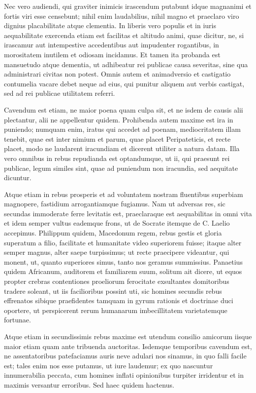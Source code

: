  Nec vero audiendi, qui graviter inimicis irascendum putabunt idque magnanimi et fortis viri esse censebunt; nihil enim laudabilius, nihil magno et praeclaro viro dignius placabilitate atque clementia. In liberis vero populis et in iuris aequabilitate exercenda etiam est facilitas et altitudo animi, quae dicitur, ne, si irascamur aut intempestive accedentibus aut impudenter rogantibus, in morositatem inutilem et odiosam incidamus. Et tamen ita probanda est mansuetudo atque dementia, ut adhibeatur rei publicae causa severitas, sine qua administrari civitas non potest. Omnis autem et animadversio et castigatio contumelia vacare debet neque ad eius, qui punitur aliquem aut verbis castigat, sed ad rei publicae utilitatem referri.

 Cavendum est etiam, ne maior poena quam culpa sit, et ne isdem de causis alii plectantur, alii ne appellentur quidem. Prohibenda autem maxime est ira in puniendo; numquam enim, iratus qui accedet ad poenam, mediocritatem illam tenebit, quae est inter nimium et parum, quae placet Peripateticis, et recte placet, modo ne laudarent iracundiam et dicerent utiliter a natura datam. Illa vero omnibus in rebus repudianda est optandumque, ut ii, qui praesunt rei publicae, legum similes sint, quae ad puniendum non iracundia, sed aequitate dicuntur.

 Atque etiam in rebus prosperis et ad voluntatem nostram fluentibus superbiam magnopere, fastidium arrogantiamque fugiamus. Nam ut adversas res, sic secundas immoderate ferre levitatis est, praeclaraque est aequabilitas in omni vita et idem semper vultus eademque frons, ut de Socrate itemque de C. Laelio accepimus. Philippum quidem, Macedonum regem, rebus gestis et gloria superatum a filio, facilitate et humanitate video superiorem fuisse; itaque alter semper magnus, alter saepe turpissimus; ut recte praecipere videantur, qui monent, ut, quanto superiores simus, tanto nos geramus summissius. Panaetius quidem Africanum, auditorem et familiarem suum, solitum ait dicere, ut equos propter crebras contentiones proeliorum ferocitate exsultantes domitoribus tradere soleant, ut iis facilioribus possint uti, sic homines secundis rebus effrenatos sibique praefidentes tamquam in gyrum rationis et doctrinae duci oportere, ut perspicerent rerum humanarum imbecillitatem varietatemque fortunae.

 Atque etiam in secundissimis rebus maxime est utendum consilio amicorum iisque maior etiam quam ante tribuenda auctoritas. Isdemque temporibus cavendum est, ne assentatoribus patefaciamus auris neve adulari nos sinamus, in quo falli facile est; tales enim nos esse putamus, ut iure laudemur; ex quo nascuntur innumerabilia peccata, cum homines inflati opinionibus turpiter irridentur et in maximis versantur erroribus. Sed haec quidem hactenus.

